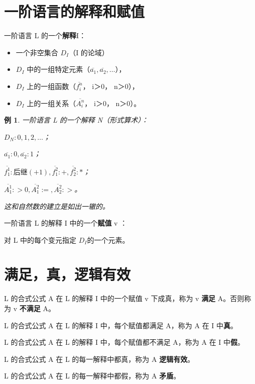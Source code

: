 \documentclass[12pt,onecolumn,a4paper]{book}
\newtheorem*{example}{例}
\numberwithin{table}{subsection}
\numberwithin{equation}{subsection}
\begin{document}
\section{一阶语言的解释和赋值}

一阶语言 L 的一个\textbf{解释}I：
\begin{itemize}[itemsep=0pt,parsep=0pt]
    \item 一个非空集合 $D_I$（I 的论域）
    \item $D_I$ 中的一组特定元素（$\overline{a_1} ,\overline{a_2} , …$），
    \item $D_I$ 上的一组函数（$\overline{f_i^n} $， i＞0， n＞0），
    \item $D_I$ 上的一组关系（$\overline{A_i^n} $， i＞0， n＞0）。
\end{itemize}

\begin{example}
    一阶语言 L 的一个解释 N（形式算术）：
    
    $D_N : { 0,1,2, … }$；
    
    $\overline{a_1} : 0, \overline{a_2} : 1$；

    $\overline{f_1^1} :\text{后继}(+1),\overline{f_1^2}  :+ , \overline{f_2^2}  :*$；

    $\overline{A_1^1} :>0, \overline{A_1^2} :=, \overline{A_2^2} :>$。

    这和自然数的建立是如出一辙的。
\end{example}

一阶语言 L 的解释 I 中的一个\textbf{赋值} v ：

对 L 中的每个变元指定 $D_I$的一个元素。

\section{满足，真，逻辑有效}

L 的合式公式 A 在 L 的解释 I 中的一个赋值 v 下成真，称为 v \textbf{满足} A。否则称为 v \textbf{不满足}  A。

L 的合式公式 A 在 L 的解释 I 中，每个赋值都满足 A，称为 A 在 I 中\textbf{真}。

L 的合式公式 A 在 L 的解释 I 中，每个赋值都不满足 A，称为 A 在 I 中\textbf{假}。

L 的合式公式 A 在 L 的每一解释中都真，称为 A \textbf{逻辑有效}。

L 的合式公式 A 在 L 的每一解释中都假，称为 A \textbf{矛盾}。
\end{document}
